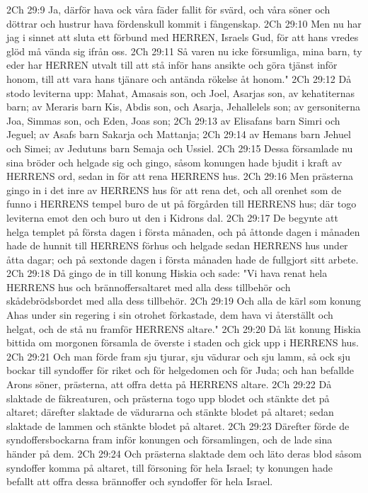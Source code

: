 2Ch 29:9  Ja, därför hava ock våra fäder fallit för svärd, och våra söner och döttrar och hustrur hava fördenskull kommit i fångenskap.
2Ch 29:10  Men nu har jag i sinnet att sluta ett förbund med HERREN, Israels Gud, för att hans vredes glöd må vända sig ifrån oss.
2Ch 29:11  Så varen nu icke försumliga, mina barn, ty eder har HERREN utvalt till att stå inför hans ansikte och göra tjänst inför honom, till att vara hans tjänare och antända rökelse åt honom."
2Ch 29:12  Då stodo leviterna upp: Mahat, Amasais son, och Joel, Asarjas son, av kehatiternas barn; av Meraris barn Kis, Abdis son, och Asarja, Jehallelels son; av gersoniterna Joa, Simmas son, och Eden, Joas son;
2Ch 29:13  av Elisafans barn Simri och Jeguel; av Asafs barn Sakarja och Mattanja;
2Ch 29:14  av Hemans barn Jehuel och Simei; av Jedutuns barn Semaja och Ussiel.
2Ch 29:15  Dessa församlade nu sina bröder och helgade sig och gingo, såsom konungen hade bjudit i kraft av HERRENS ord, sedan in för att rena HERRENS hus.
2Ch 29:16  Men prästerna gingo in i det inre av HERRENS hus för att rena det, och all orenhet som de funno i HERRENS tempel buro de ut på förgården till HERRENS hus; där togo leviterna emot den och buro ut den i Kidrons dal.
2Ch 29:17  De begynte att helga templet på första dagen i första månaden, och på åttonde dagen i månaden hade de hunnit till HERRENS förhus och helgade sedan HERRENS hus under åtta dagar; och på sextonde dagen i första månaden hade de fullgjort sitt arbete.
2Ch 29:18  Då gingo de in till konung Hiskia och sade: "Vi hava renat hela HERRENS hus och brännoffersaltaret med alla dess tillbehör och skådebrödsbordet med alla dess tillbehör.
2Ch 29:19  Och alla de kärl som konung Ahas under sin regering i sin otrohet förkastade, dem hava vi återställt och helgat, och de stå nu framför HERRENS altare."
2Ch 29:20  Då lät konung Hiskia bittida om morgonen församla de överste i staden och gick upp i HERRENS hus.
2Ch 29:21  Och man förde fram sju tjurar, sju vädurar och sju lamm, så ock sju bockar till syndoffer för riket och för helgedomen och för Juda; och han befallde Arons söner, prästerna, att offra detta på HERRENS altare.
2Ch 29:22  Då slaktade de fäkreaturen, och prästerna togo upp blodet och stänkte det på altaret; därefter slaktade de vädurarna och stänkte blodet på altaret; sedan slaktade de lammen och stänkte blodet på altaret.
2Ch 29:23  Därefter förde de syndoffersbockarna fram inför konungen och församlingen, och de lade sina händer på dem.
2Ch 29:24  Och prästerna slaktade dem och läto deras blod såsom syndoffer komma på altaret, till försoning för hela Israel; ty konungen hade befallt att offra dessa brännoffer och syndoffer för hela Israel.
